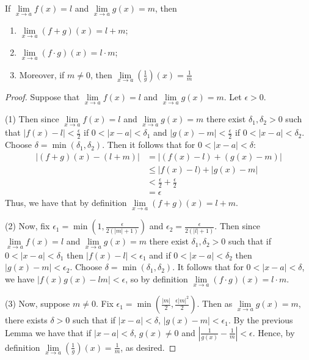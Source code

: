 \documentclass[12pt, a4paper, oneside, openright, titlepage]{book}
\begin{document}
\begin{thm}\label{thm:limlaws}
    If $\lim\limits_{x\rightarrow a}f(x) = l$ and $\lim\limits_{x\rightarrow a}g(x) = m$, then \begin{enumerate}
        \item $\lim\limits_{x\rightarrow a}(f+g)(x) = l+m$;
        \item $\lim\limits_{x\rightarrow a}(f\cdot g)(x) = l\cdot m$;
        \item Moreover, if $m \neq 0$, then $\lim\limits_{x\rightarrow a}\left(\frac{1}{g}\right)(x) = \frac{1}{m}$
    \end{enumerate}
\end{thm}
\begin{proof}
    Suppose that $\lim\limits_{x\rightarrow a}f(x) = l$ and $\lim\limits_{x\rightarrow a}g(x) = m$. Let $\epsilon > 0$.


    (1) Then since $\lim\limits_{x\rightarrow a}f(x) = l$ and $\lim\limits_{x\rightarrow a}g(x) = m$ there exist $\delta_1,\delta_2 > 0$ such that $|f(x) - l| < \frac{\epsilon}{2}$ if $0 < |x-a| < \delta_1$ and $|g(x) - m| < \frac{\epsilon}{2}$ if $0 < |x-a| < \delta_2$. Choose $\delta = \min(\delta_1,\delta_2)$. Then it follows that for $0 < |x-a| < \delta$: \begin{align*}
        |(f+g)(x) - (l+m)| &= |(f(x) - l) + (g(x) - m)| \\
        &\leq |f(x) - l) + |g(x) - m| \\
        &< \frac{\epsilon}{2} + \frac{\epsilon}{2} \\
        &= \epsilon
    \end{align*}
    Thus, we have that by definition $\lim\limits_{x\rightarrow a}(f+g)(x) = l+m$.


    (2) Now, fix $\epsilon_1 = \min\left(1,\frac{\epsilon}{2(|m|+1)}\right)$ and $\epsilon_2 = \frac{\epsilon}{2(|l| + 1)}$. Then since $\lim\limits_{x\rightarrow a}f(x) = l$ and $\lim\limits_{x\rightarrow a}g(x) = m$ there exist $\delta_1, \delta_2> 0$ such that if $0<|x-a| < \delta_1$ then $|f(x) - l| < \epsilon_1$ and if $0<|x-a| < \delta_2$ then $|g(x) - m| < \epsilon_2$. Choose $\delta = \min(\delta_1,\delta_2)$. It follows that for $0<|x-a| < \delta$, we have $|f(x)g(x) - lm| < \epsilon$, so by definition $\lim\limits_{x\rightarrow a}(f\cdot g)(x) = l\cdot m$.



    (3) Now, suppose $m \neq 0$. Fix $\epsilon_1 = \min\left(\frac{|m|}{2},\frac{\epsilon|m|^2}{2}\right)$. Then as $\lim\limits_{x\rightarrow a}g(x) = m$, there exists $\delta > 0$ such that if $|x-a| < \delta$, $|g(x) - m| < \epsilon_1$. By the previous Lemma we have that if $|x-a| < \delta$, $g(x) \neq 0$ and $\left|\frac{1}{g(x)} - \frac{1}{m}\right| < \epsilon$. Hence, by definition $\lim\limits_{x\rightarrow a}\left(\frac{1}{g}\right)(x) = \frac{1}{m}$, as desired.
\end{proof}
\end{document}
